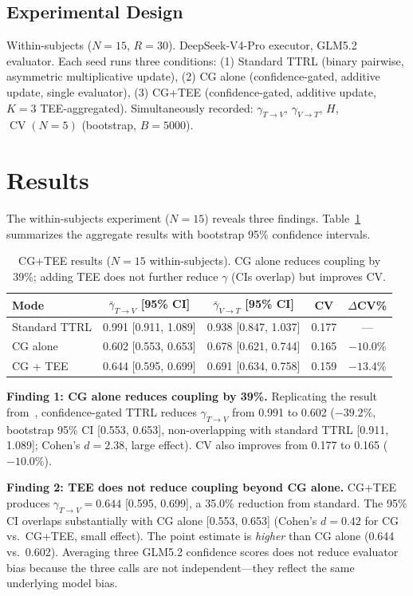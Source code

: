 \documentclass[11pt]{article}
\DeclareMathOperator{\CV}{CV}
\begin{document}
\subsection{Experimental Design}

Within-subjects ($N{=}15$, $R{=}30$). DeepSeek-V4-Pro executor, GLM5.2 evaluator. Each seed runs three conditions: (1) Standard TTRL (binary pairwise, asymmetric multiplicative update), (2) CG alone (confidence-gated, additive update, single evaluator), (3) CG+TEE (confidence-gated, additive update, $K{=}3$ TEE-aggregated). Simultaneously recorded: $\gamma_{T\to V}$, $\gamma_{V\to T}$, $H$, $\CV(N{=}5)$ (bootstrap, $B{=}5000$).

\section{Results}

The within-subjects experiment ($N{=}15$) reveals three findings. Table~\ref{tab:results} summarizes the aggregate results with bootstrap 95\% confidence intervals.

\begin{table}[H]
\centering
\caption{CG+TEE results ($N{=}15$ within-subjects). CG alone reduces coupling by 39\%; adding TEE does not further reduce $\gamma$ (CIs overlap) but improves CV.}
\label{tab:results}
\begin{tabular}{@{}lcccc@{}}
\toprule
\textbf{Mode} & $\bar{\gamma}_{T{\to}V}$ [95\% CI] & $\bar{\gamma}_{V{\to}T}$ [95\% CI] & CV & $\Delta$CV\% \\
\midrule
Standard TTRL   & 0.991 [0.911, 1.089] & 0.938 [0.847, 1.037] & 0.177 & --- \\
CG alone        & 0.602 [0.553, 0.653] & 0.678 [0.621, 0.744] & 0.165 & $-10.0\%$ \\
CG + TEE        & 0.644 [0.595, 0.699] & 0.691 [0.634, 0.758] & 0.159 & $\mathbf{-13.4\%}$ \\
\bottomrule
\end{tabular}
\end{table}

\textbf{Finding 1: CG alone reduces coupling by 39\%.} Replicating the result from~\cite{liu2026caleffects}, confidence-gated TTRL reduces $\gamma_{T\to V}$ from 0.991 to 0.602 ($-39.2\%$, bootstrap 95\% CI [0.553, 0.653], non-overlapping with standard TTRL [0.911, 1.089]; Cohen's $d = 2.38$, large effect). CV also improves from 0.177 to 0.165 ($-10.0\%$).

\textbf{Finding 2: TEE does not reduce coupling beyond CG alone.} CG+TEE produces $\gamma_{T\to V} = 0.644$ [0.595, 0.699], a 35.0\% reduction from standard. The 95\% CI overlaps substantially with CG alone [0.553, 0.653] (Cohen's $d = 0.42$ for CG vs.\ CG+TEE, small effect). The point estimate is \textit{higher} than CG alone (0.644 vs.\ 0.602). Averaging three GLM5.2 confidence scores does not reduce evaluator bias because the three calls are not independent---they reflect the same underlying model bias.
\end{document}
